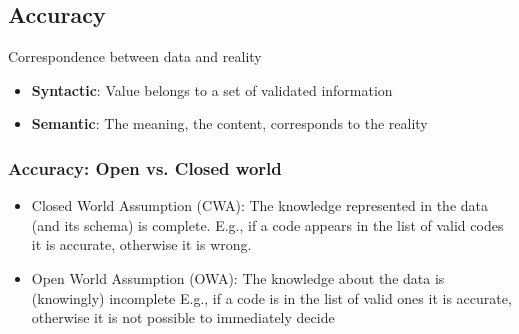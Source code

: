 \subsection{Accuracy}

Correspondence between data and reality

\begin{itemize}
  \item \textbf{Syntactic}: Value belongs to a set of validated information
  \item \textbf{Semantic}: The meaning, the content, corresponds to the reality
\end{itemize}

\subsubsection{Accuracy: Open vs. Closed world}


\begin{itemize}
  \item Closed World Assumption (CWA): The knowledge represented in the data (and its schema) is
        complete. E.g., if a code appears in the list of valid codes it is
        accurate, otherwise it is wrong.
  \item Open World Assumption (OWA): The knowledge about the data is (knowingly) incomplete E.g., if a code is in the list of valid ones it is accurate,
        otherwise it is not possible to immediately decide
\end{itemize}









